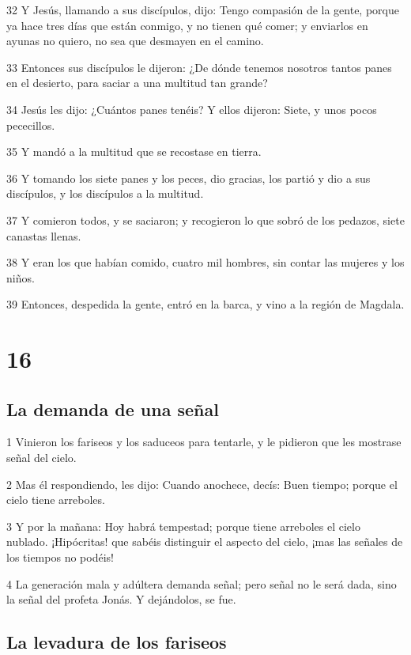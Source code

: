 \par 32 Y Jesús, llamando a sus discípulos, dijo: Tengo compasión de la gente, porque ya hace tres días que están conmigo, y no tienen qué comer; y enviarlos en ayunas no quiero, no sea que desmayen en el camino.
\par 33 Entonces sus discípulos le dijeron: ¿De dónde tenemos nosotros tantos panes en el desierto, para saciar a una multitud tan grande?
\par 34 Jesús les dijo: ¿Cuántos panes tenéis? Y ellos dijeron: Siete, y unos pocos pececillos.
\par 35 Y mandó a la multitud que se recostase en tierra.
\par 36 Y tomando los siete panes y los peces, dio gracias, los partió y dio a sus discípulos, y los discípulos a la multitud.
\par 37 Y comieron todos, y se saciaron; y recogieron lo que sobró de los pedazos, siete canastas llenas.
\par 38 Y eran los que habían comido, cuatro mil hombres, sin contar las mujeres y los niños.
\par 39 Entonces, despedida la gente, entró en la barca, y vino a la región de Magdala.

\chapter{16}

\section*{La demanda de una señal}

\par 1 Vinieron los fariseos y los saduceos para tentarle, y le pidieron que les mostrase señal del cielo.
\par 2 Mas él respondiendo, les dijo: Cuando anochece, decís: Buen tiempo; porque el cielo tiene arreboles.
\par 3 Y por la mañana: Hoy habrá tempestad; porque tiene arreboles el cielo nublado. ¡Hipócritas! que sabéis distinguir el aspecto del cielo, ¡mas las señales de los tiempos no podéis!
\par 4 La generación mala y adúltera demanda señal; pero señal no le será dada, sino la señal del profeta Jonás. Y dejándolos, se fue.

\section*{La levadura de los fariseos}


